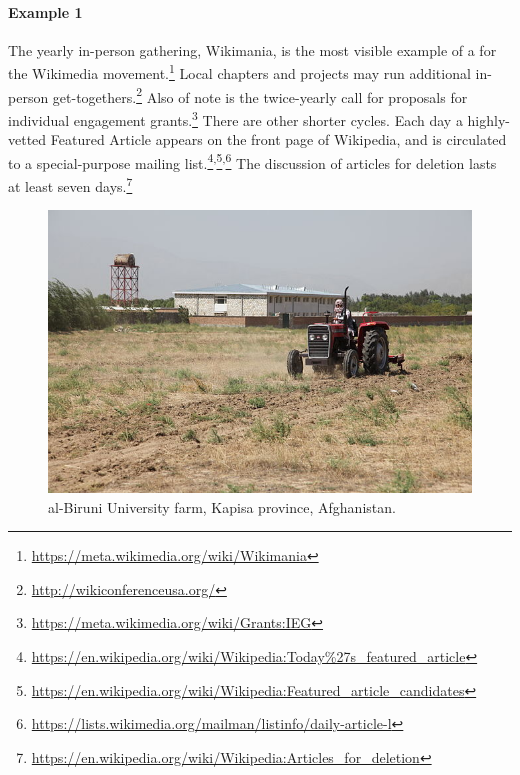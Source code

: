 \begin{refsection}
\paragraph{Example 1} The yearly in-person gathering, Wikimania, is the most visible
example of a  for the Wikimedia
movement.\footnote{\url{https://meta.wikimedia.org/wiki/Wikimania}}
Local chapters and projects may run additional in-person
get-togethers.\footnote{\url{http://wikiconferenceusa.org/}} Also of
note is the twice-yearly call for proposals for individual engagement
grants.\footnote{\url{https://meta.wikimedia.org/wiki/Grants:IEG}}
There are other shorter cycles.  
Each day a highly-vetted Featured Article appears on the front page of Wikipedia, and is circulated to a special-purpose mailing list.\footnote{\url{https://en.wikipedia.org/wiki/Wikipedia:Today\%27s_featured_article}}\textsuperscript{,}\footnote{\url{https://en.wikipedia.org/wiki/Wikipedia:Featured_article_candidates}}\textsuperscript{,}\footnote{\url{https://lists.wikimedia.org/mailman/listinfo/daily-article-l}}
The discussion of articles for
deletion lasts at least seven days.\footnote{\url{https://en.wikipedia.org/wiki/Wikipedia:Articles_for_deletion}}


\begin{figure}[t]
\includegraphics[width=\textwidth]{../pictures/kapisa.jpg}
\caption{al-Biruni University farm, Kapisa province, Afghanistan.
\label{farm}}
\end{figure}


\end{refsection}
